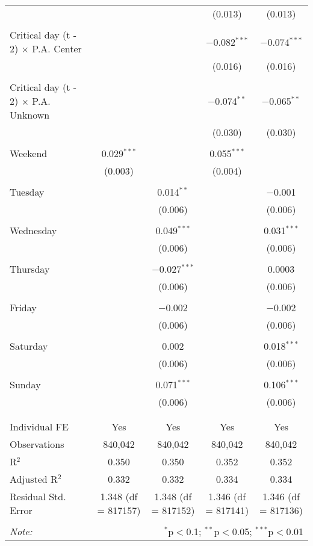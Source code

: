 \documentclass[
]{article}
\begin{document}
\begin{table}[!htbp]
{\begin{tabular}{@{\extracolsep{5pt}}lcccc}
  &  &  & (0.013) & (0.013) \\ 
  & & & & \\ 
 Critical day (t - 2) $\times$ P.A. Center &  &  & $-$0.082$^{***}$ & $-$0.074$^{***}$ \\ 
  &  &  & (0.016) & (0.016) \\ 
  & & & & \\ 
 Critical day (t - 2) $\times$ P.A. Unknown &  &  & $-$0.074$^{**}$ & $-$0.065$^{**}$ \\ 
  &  &  & (0.030) & (0.030) \\ 
  & & & & \\ 
 Weekend & 0.029$^{***}$ &  & 0.055$^{***}$ &  \\ 
  & (0.003) &  & (0.004) &  \\ 
  & & & & \\ 
 Tuesday &  & 0.014$^{**}$ &  & $-$0.001 \\ 
  &  & (0.006) &  & (0.006) \\ 
  & & & & \\ 
 Wednesday &  & 0.049$^{***}$ &  & 0.031$^{***}$ \\ 
  &  & (0.006) &  & (0.006) \\ 
  & & & & \\ 
 Thursday &  & $-$0.027$^{***}$ &  & 0.0003 \\ 
  &  & (0.006) &  & (0.006) \\ 
  & & & & \\ 
 Friday &  & $-$0.002 &  & $-$0.002 \\ 
  &  & (0.006) &  & (0.006) \\ 
  & & & & \\ 
 Saturday &  & 0.002 &  & 0.018$^{***}$ \\ 
  &  & (0.006) &  & (0.006) \\ 
  & & & & \\ 
 Sunday &  & 0.071$^{***}$ &  & 0.106$^{***}$ \\ 
  &  & (0.006) &  & (0.006) \\ 
  & & & & \\ 
\hline \\[-1.8ex] 
Individual FE & Yes & Yes & Yes & Yes \\ 
Observations & 840,042 & 840,042 & 840,042 & 840,042 \\ 
R$^{2}$ & 0.350 & 0.350 & 0.352 & 0.352 \\ 
Adjusted R$^{2}$ & 0.332 & 0.332 & 0.334 & 0.334 \\ 
Residual Std. Error & 1.348 (df = 817157) & 1.348 (df = 817152) & 1.346 (df = 817141) & 1.346 (df = 817136) \\ 
\hline 
\hline \\[-1.8ex] 
\textit{Note:}  & \multicolumn{4}{r}{$^{*}$p$<$0.1; $^{**}$p$<$0.05; $^{***}$p$<$0.01} \\ 
\end{tabular}
} 
\end{table} 
\newpage
\end{document}
